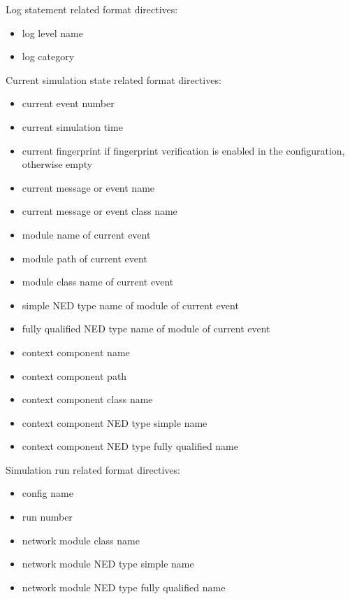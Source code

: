 Log statement related format directives:
\begin{itemize}
  \item {} log level name
  \item {} log category
\end{itemize}

Current simulation state related format directives:
\begin{itemize}
  \item {} current event number
  \item {} current simulation time
  \item {} current fingerprint if fingerprint verification is enabled in the configuration, otherwise empty
  \item {} current message or event name
  \item {} current message or event class name
  \item {} module name of current event
  \item {} module path of current event
  \item {} module class name of current event
  \item {} simple NED type name of module of current event
  \item {} fully qualified NED type name of module of current event
  \item {} context component name
  \item {} context component path
  \item {} context component class name
  \item {} context component NED type simple name
  \item {} context component NED type fully qualified name
\end{itemize}

Simulation run related format directives:
\begin{itemize}
  \item {} config name
  \item {} run number
  \item {} network module class name
  \item {} network module NED type simple name
  \item {} network module NED type fully qualified name
\end{itemize}

